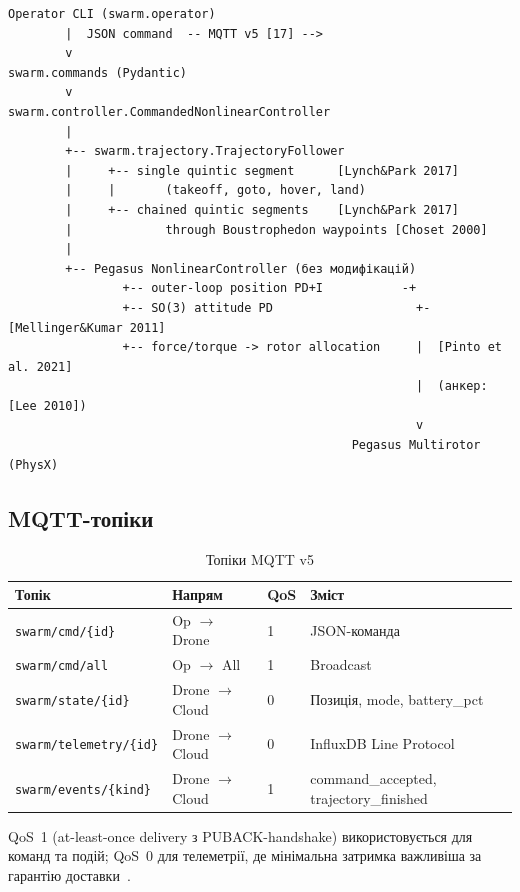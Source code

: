 \begin{verbatim}
Operator CLI (swarm.operator)
        |  JSON command  -- MQTT v5 [17] -->
        v
swarm.commands (Pydantic)
        v
swarm.controller.CommandedNonlinearController
        |
        +-- swarm.trajectory.TrajectoryFollower
        |     +-- single quintic segment      [Lynch&Park 2017]
        |     |       (takeoff, goto, hover, land)
        |     +-- chained quintic segments    [Lynch&Park 2017]
        |             through Boustrophedon waypoints [Choset 2000]
        |
        +-- Pegasus NonlinearController (без модифікацій)
                +-- outer-loop position PD+I           -+
                +-- SO(3) attitude PD                    +- [Mellinger&Kumar 2011]
                +-- force/torque -> rotor allocation     |  [Pinto et al. 2021]
                                                         |  (анкер: [Lee 2010])
                                                         v
                                                Pegasus Multirotor (PhysX)
\end{verbatim}

\subsection{MQTT-топіки}

\begin{table}[h]
  \centering
  \caption{Топіки MQTT v5}
  \begin{tabularx}{\linewidth}{lllX}
    \toprule
    Топік & Напрям & QoS & Зміст \\
    \midrule
    \texttt{swarm/cmd/\{id\}} & Op $\to$ Drone & 1 & JSON-команда \\
    \texttt{swarm/cmd/all}    & Op $\to$ All   & 1 & Broadcast \\
    \texttt{swarm/state/\{id\}}     & Drone $\to$ Cloud & 0 & Позиція, mode, battery\_pct \\
    \texttt{swarm/telemetry/\{id\}} & Drone $\to$ Cloud & 0 & InfluxDB Line Protocol \\
    \texttt{swarm/events/\{kind\}}  & Drone $\to$ Cloud & 1 & command\_accepted, trajectory\_finished \\
    \bottomrule
  \end{tabularx}
  \label{tab:topics}
\end{table}

QoS~1 (at-least-once delivery з PUBACK-handshake) використовується для команд та подій; QoS~0 для телеметрії, де мінімальна затримка важливіша за гарантію доставки~\cite{MQTT5}.

